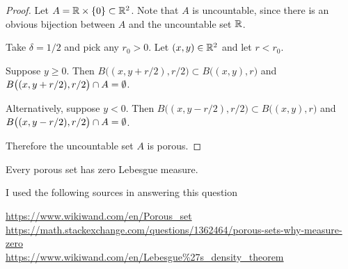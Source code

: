 \begin{proof}
  Let $A = \mathbb{R} \times \{0\} \subset \mathbb{R}^2$. Note that $A$ is uncountable, since there is an obvious bijection
  between $A$ and the uncountable set $\mathbb{R}$.

  Take $\delta = 1/2$ and pick any $r_0 > 0$. Let $(x, y) \in \mathbb{R}^2$ and let $r < r_0$.

  Suppose $y \geq 0$. Then $B\big((x, y + r/2), r/2\big) \subset B\big((x, y), r\big)$
  and $B\big((x, y + r/2), r/2\big) \cap A = \emptyset$.

  Alternatively, suppose $y < 0$. Then $B\big((x, y - r/2), r/2\big) \subset B\big((x, y), r\big)$
  and $B\big((x, y - r/2), r/2\big) \cap A = \emptyset$.

  Therefore the uncountable set $A$ is porous.
\end{proof}

\begin{claim}
  Every porous set has zero Lebesgue measure.
\end{claim}

I used the following sources in answering this question

\url{https://www.wikiwand.com/en/Porous_set}\\
\url{https://math.stackexchange.com/questions/1362464/porous-sets-why-measure-zero}\\
\url{https://www.wikiwand.com/en/Lebesgue%27s_density_theorem}\\

